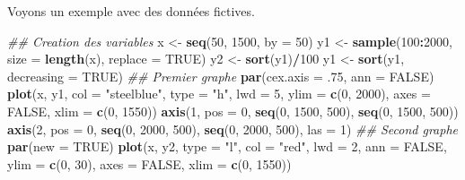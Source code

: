 \documentclass[]{article}
\newenvironment{Shaded}{\begin{snugshade}}{\end{snugshade}}
\newcommand{\CommentTok}[1]{\textcolor[rgb]{0.56,0.35,0.01}{\textit{#1}}}
\newcommand{\DataTypeTok}[1]{\textcolor[rgb]{0.13,0.29,0.53}{#1}}
\newcommand{\DecValTok}[1]{\textcolor[rgb]{0.00,0.00,0.81}{#1}}
\newcommand{\FloatTok}[1]{\textcolor[rgb]{0.00,0.00,0.81}{#1}}
\newcommand{\KeywordTok}[1]{\textcolor[rgb]{0.13,0.29,0.53}{\textbf{#1}}}
\newcommand{\NormalTok}[1]{#1}
\newcommand{\OperatorTok}[1]{\textcolor[rgb]{0.81,0.36,0.00}{\textbf{#1}}}
\newcommand{\OtherTok}[1]{\textcolor[rgb]{0.56,0.35,0.01}{#1}}
\newcommand{\StringTok}[1]{\textcolor[rgb]{0.31,0.60,0.02}{#1}}
\begin{document}
Voyons un exemple avec des données fictives.

\begin{Shaded}
\begin{Highlighting}[]
\CommentTok{## Creation des variables}
\NormalTok{x <-}\StringTok{ }\KeywordTok{seq}\NormalTok{(}\DecValTok{50}\NormalTok{, }\DecValTok{1500}\NormalTok{, }\DataTypeTok{by =} \DecValTok{50}\NormalTok{)}
\NormalTok{y1 <-}\StringTok{ }\KeywordTok{sample}\NormalTok{(}\DecValTok{100}\OperatorTok{:}\DecValTok{2000}\NormalTok{, }\DataTypeTok{size =} \KeywordTok{length}\NormalTok{(x), }\DataTypeTok{replace =} \OtherTok{TRUE}\NormalTok{)}
\NormalTok{y2 <-}\StringTok{ }\KeywordTok{sort}\NormalTok{(y1)}\OperatorTok{/}\DecValTok{100}
\NormalTok{y1 <-}\StringTok{ }\KeywordTok{sort}\NormalTok{(y1, }\DataTypeTok{decreasing =} \OtherTok{TRUE}\NormalTok{)}
\CommentTok{## Premier graphe}
\KeywordTok{par}\NormalTok{(}\DataTypeTok{cex.axis =} \FloatTok{.75}\NormalTok{, }\DataTypeTok{ann =} \OtherTok{FALSE}\NormalTok{)}
\KeywordTok{plot}\NormalTok{(x, y1, }\DataTypeTok{col =} \StringTok{"steelblue"}\NormalTok{, }\DataTypeTok{type =} \StringTok{"h"}\NormalTok{, }\DataTypeTok{lwd =} \DecValTok{5}\NormalTok{, }\DataTypeTok{ylim =} \KeywordTok{c}\NormalTok{(}\DecValTok{0}\NormalTok{, }\DecValTok{2000}\NormalTok{), }\DataTypeTok{axes =} \OtherTok{FALSE}\NormalTok{, }\DataTypeTok{xlim =} \KeywordTok{c}\NormalTok{(}\DecValTok{0}\NormalTok{, }\DecValTok{1550}\NormalTok{))}
\KeywordTok{axis}\NormalTok{(}\DecValTok{1}\NormalTok{, }\DataTypeTok{pos =} \DecValTok{0}\NormalTok{, }\KeywordTok{seq}\NormalTok{(}\DecValTok{0}\NormalTok{, }\DecValTok{1500}\NormalTok{, }\DecValTok{500}\NormalTok{), }\KeywordTok{seq}\NormalTok{(}\DecValTok{0}\NormalTok{, }\DecValTok{1500}\NormalTok{, }\DecValTok{500}\NormalTok{))}
\KeywordTok{axis}\NormalTok{(}\DecValTok{2}\NormalTok{, }\DataTypeTok{pos =} \DecValTok{0}\NormalTok{, }\KeywordTok{seq}\NormalTok{(}\DecValTok{0}\NormalTok{, }\DecValTok{2000}\NormalTok{, }\DecValTok{500}\NormalTok{), }\KeywordTok{seq}\NormalTok{(}\DecValTok{0}\NormalTok{, }\DecValTok{2000}\NormalTok{, }\DecValTok{500}\NormalTok{), }\DataTypeTok{las =} \DecValTok{1}\NormalTok{)}
\CommentTok{## Second graphe}
\KeywordTok{par}\NormalTok{(}\DataTypeTok{new =} \OtherTok{TRUE}\NormalTok{)}
\KeywordTok{plot}\NormalTok{(x, y2, }\DataTypeTok{type =} \StringTok{"l"}\NormalTok{, }\DataTypeTok{col =} \StringTok{"red"}\NormalTok{, }\DataTypeTok{lwd =} \DecValTok{2}\NormalTok{, }\DataTypeTok{ann =} \OtherTok{FALSE}\NormalTok{, }\DataTypeTok{ylim =} \KeywordTok{c}\NormalTok{(}\DecValTok{0}\NormalTok{, }\DecValTok{30}\NormalTok{), }\DataTypeTok{axes =} \OtherTok{FALSE}\NormalTok{, }\DataTypeTok{xlim =} \KeywordTok{c}\NormalTok{(}\DecValTok{0}\NormalTok{, }\DecValTok{1550}\NormalTok{))}

\end{Highlighting}
\end{Shaded}
\end{document}
